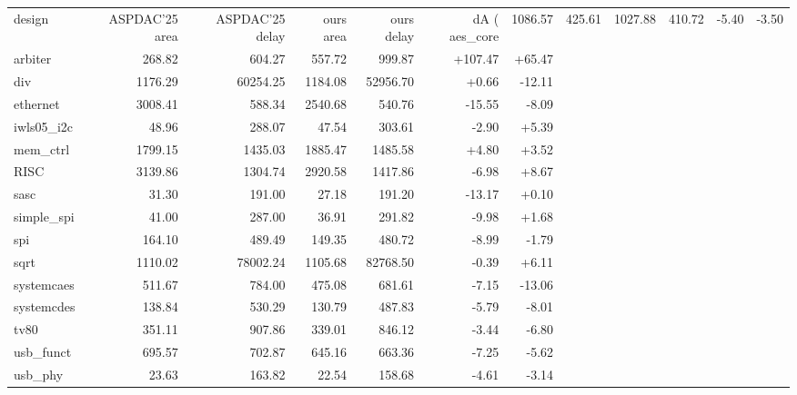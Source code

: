 \begin{tabular}{lrrrrrr}
  \toprule
  design & ASPDAC'25 area & ASPDAC'25 delay & ours area & ours delay & dA (%
  \midrule
  aes\_core & 1086.57 & 425.61 & 1027.88 & 410.72 & -5.40 & -3.50 \\
  arbiter & 268.82 & 604.27 & 557.72 & 999.87 & +107.47 & +65.47 \\
  div & 1176.29 & 60254.25 & 1184.08 & 52956.70 & +0.66 & -12.11 \\
  ethernet & 3008.41 & 588.34 & 2540.68 & 540.76 & -15.55 & -8.09 \\
  iwls05\_i2c & 48.96 & 288.07 & 47.54 & 303.61 & -2.90 & +5.39 \\
  mem\_ctrl & 1799.15 & 1435.03 & 1885.47 & 1485.58 & +4.80 & +3.52 \\
  RISC & 3139.86 & 1304.74 & 2920.58 & 1417.86 & -6.98 & +8.67 \\
  sasc & 31.30 & 191.00 & 27.18 & 191.20 & -13.17 & +0.10 \\
  simple\_spi & 41.00 & 287.00 & 36.91 & 291.82 & -9.98 & +1.68 \\
  spi & 164.10 & 489.49 & 149.35 & 480.72 & -8.99 & -1.79 \\
  sqrt & 1110.02 & 78002.24 & 1105.68 & 82768.50 & -0.39 & +6.11 \\
  systemcaes & 511.67 & 784.00 & 475.08 & 681.61 & -7.15 & -13.06 \\
  systemcdes & 138.84 & 530.29 & 130.79 & 487.83 & -5.79 & -8.01 \\
  tv80 & 351.11 & 907.86 & 339.01 & 846.12 & -3.44 & -6.80 \\
  usb\_funct & 695.57 & 702.87 & 645.16 & 663.36 & -7.25 & -5.62 \\
  usb\_phy & 23.63 & 163.82 & 22.54 & 158.68 & -4.61 & -3.14 \\
  \bottomrule
\end{tabular}



